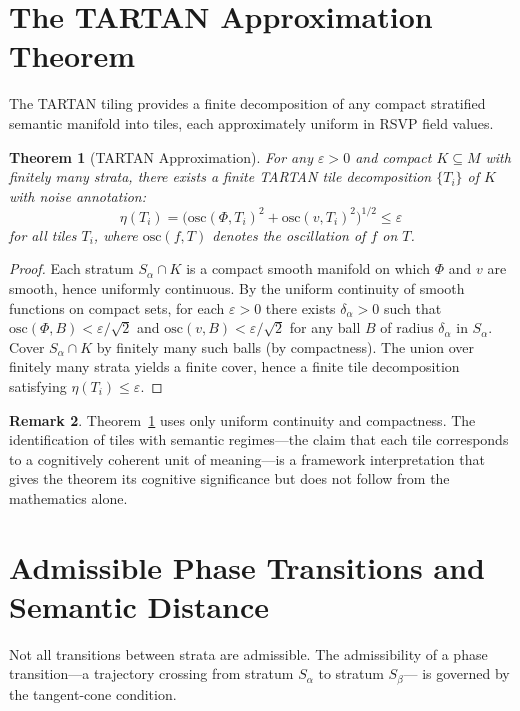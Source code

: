 \documentclass[12pt, oneside]{book}
\theoremstyle{flyxion}
\newtheorem{theorem}{Theorem}[chapter]
\theoremstyle{definition}
\newtheorem{remark}[theorem]{Remark}
\begin{document}
\section{The TARTAN Approximation Theorem}

The TARTAN tiling provides a finite decomposition of
any compact stratified semantic manifold into tiles,
each approximately uniform in RSVP field values.

\begin{theorem}[TARTAN Approximation]
\label{thm:tartan}
For any $\varepsilon > 0$ and compact $K \subseteq M$
with finitely many strata, there exists a finite TARTAN
tile decomposition $\{T_i\}$ of $K$ with noise
annotation:
\[
\eta(T_i) = \bigl(\mathrm{osc}(\Phi, T_i)^2 +
\mathrm{osc}(v, T_i)^2\bigr)^{1/2} \leq \varepsilon
\]
for all tiles $T_i$, where $\mathrm{osc}(f, T)$
denotes the oscillation of $f$ on $T$.
\end{theorem}

\begin{proof}
Each stratum $S_\alpha \cap K$ is a compact smooth
manifold on which $\Phi$ and $v$ are smooth, hence
uniformly continuous. By the uniform continuity of
smooth functions on compact sets, for each $\varepsilon
> 0$ there exists $\delta_\alpha > 0$ such that
$\mathrm{osc}(\Phi, B) < \varepsilon/\sqrt{2}$ and
$\mathrm{osc}(v, B) < \varepsilon/\sqrt{2}$ for any
ball $B$ of radius $\delta_\alpha$ in $S_\alpha$.
Cover $S_\alpha \cap K$ by finitely many such balls
(by compactness). The union over finitely many strata
yields a finite cover, hence a finite tile decomposition
satisfying $\eta(T_i) \leq \varepsilon$.
\end{proof}

\begin{remark}
Theorem~\ref{thm:tartan} uses only uniform continuity
and compactness. The identification of tiles with
semantic regimes---the claim that each tile corresponds
to a cognitively coherent unit of meaning---is a
framework interpretation that gives the theorem its
cognitive significance but does not follow from the
mathematics alone.
\end{remark}

\section{Admissible Phase Transitions and Semantic Distance}

Not all transitions between strata are admissible.
The admissibility of a phase transition---a trajectory
crossing from stratum $S_\alpha$ to stratum $S_\beta$---
is governed by the tangent-cone condition.
\end{document}
